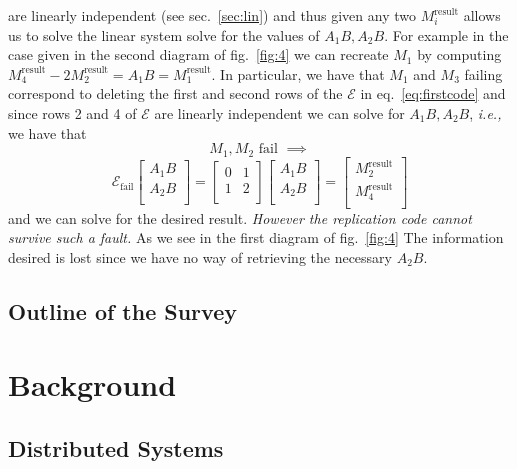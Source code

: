 \documentclass{report}
\begin{document}
are linearly independent (see sec.~\ref{sec:lin}) and thus given any two $M^\text{result}_i$ allows us to solve the linear system solve for the values of $A_1B,A_2B$. For example in the case given in the second diagram of fig.~\ref{fig:4} we can recreate $M_1$ by computing $M_{4}^\text{result} - 2M_{2}^\text{result} = A_1B = M_1^\text{result}$. In particular, we have that $M_1$ and $M_3$ failing correspond to deleting the first and second rows of the $\mathcal{E}$ in eq.~\eqref{eq:firstcode} and since rows 2 and 4 of $\mathcal{E}$ are linearly independent we can solve for $A_1B,A_2B$, \emph{i.e.,} we have that 
\begin{equation*}
    M_1, M_2 \text{ fail } \implies 
\end{equation*}\begin{equation}\label{eq:firstcode}
    \mathcal{E}_\text{fail} \begin{bmatrix}
       A_1 B\\ A_2B \\ 
    \end{bmatrix} =  \begin{bmatrix}
       0& 1\\ 
       1 & 2\\
    \end{bmatrix} \begin{bmatrix}
       A_1 B\\ A_2B \\ 
    \end{bmatrix} =  \begin{bmatrix}
       M_2^\text{result}\\ 
       M_4^\text{result}\\
    \end{bmatrix} 
\end{equation}
and we can solve for the desired result. \textit{However the replication code cannot survive such a fault.} As we see in the first diagram of fig.~\ref{fig:4} The information desired is lost since we have no way of retrieving the necessary $A_2B$. 


\section{Outline of the Survey}

\chapter{Background}

\section{Distributed Systems}
\end{document}

